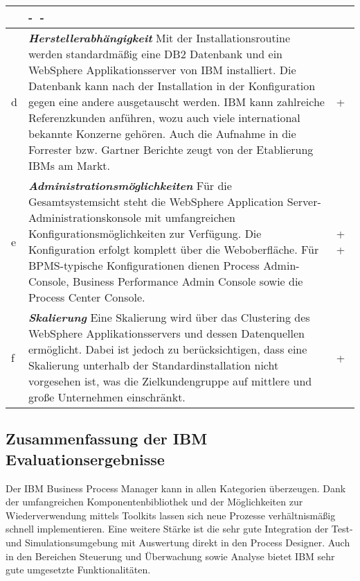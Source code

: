 \begin{longtabu}{@{\extracolsep{\fill}}|p{0.5cm}|X|p{2cm}|}
 & \centering\arraybackslash \textcircled{-} \textcircled{-} \tabularnewline
\hline 
 d 
 & \textit{\textbf{Herstellerabhängigkeit}} \newline Mit der Installationsroutine werden standardmäßig eine DB2 Datenbank und ein WebSphere Applikationsserver von IBM installiert. Die Datenbank kann nach der Installation in der Konfiguration gegen eine andere ausgetauscht werden.
 IBM kann zahlreiche Referenzkunden anführen, wozu auch viele international bekannte Konzerne gehören. Auch die Aufnahme in die Forrester bzw. Gartner Berichte zeugt von der Etablierung IBMs am Markt.\cite{Gartner.2012}\cite{Forresterresearchinc.2013} \smallskip
 & \centering\arraybackslash \textcircled{+} \tabularnewline
\hline
 e 
 & \textit{\textbf{Administrationsmöglichkeiten}} \newline  Für die Gesamtsystemsicht steht die WebSphere Application Server-Administrationskonsole mit umfangreichen Konfigurationsmöglichkeiten zur Verfügung. Die Konfiguration erfolgt komplett über die Weboberfläche. Für \ac{BPMS}-typische Konfigurationen dienen Process Admin-Console, Business Performance Admin Console sowie die Process Center Console. \smallskip
 & \centering\arraybackslash \textcircled{+} \textcircled{+} \tabularnewline
\hline
 f 
 & \textit{\textbf{Skalierung}} \newline Eine Skalierung wird über das Clustering des WebSphere Applikationsservers und dessen Datenquellen ermöglicht. Dabei ist jedoch zu berücksichtigen, dass eine Skalierung unterhalb der Standardinstallation nicht vorgesehen ist, was die Zielkundengruppe auf mittlere und große Unternehmen einschränkt. \smallskip
 & \centering\arraybackslash \textcircled{+} \tabularnewline
\hline
\end{longtabu}
\normalsize


\newpage
\subsection{Zusammenfassung der IBM Evaluationsergebnisse}

Der IBM Business Process Manager kann in allen Kategorien überzeugen. Dank der umfangreichen Komponentenbibliothek und der Möglichkeiten zur Wiederverwendung mittels Toolkits lassen sich neue Prozesse verhältnismäßig schnell implementieren. Eine weitere Stärke ist die sehr gute Integration der Test- und Simulationsumgebung mit Auswertung direkt in den Process Designer.
Auch in den Bereichen Steuerung und Überwachung sowie Analyse bietet IBM sehr gute umgesetzte Funktionalitäten.


